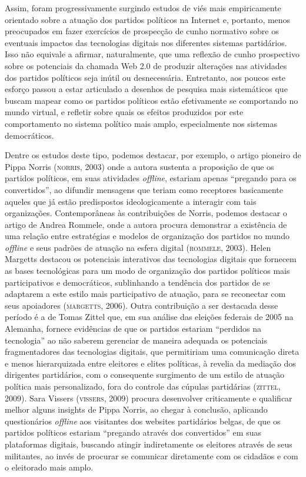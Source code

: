 Assim, foram progressivamente surgindo estudos de viés mais
empiricamente orientado sobre a atuação dos partidos políticos na
Internet e, portanto, menos preocupados em fazer exercícios de
prospecção de cunho normativo sobre os eventuais impactos das
tecnologias digitais nos diferentes sistemas partidários. Isso não
equivale a afirmar, naturalmente, que uma reflexão de cunho prospectivo
sobre os potenciais da chamada Web 2.0 de produzir alterações nas
atividades dos partidos políticos seja inútil ou desnecessária.
Entretanto, aos poucos este esforço passou a estar articulado a desenhos
de pesquisa mais sistemáticos que buscam mapear como os partidos
políticos estão efetivamente se comportando no mundo virtual, e refletir
sobre quais os efeitos produzidos por este comportamento no sistema
político mais amplo, especialmente nos sistemas democráticos.

Dentre os estudos deste tipo, podemos destacar, por exemplo, o artigo
pioneiro de Pippa Norris (\textsc{norris}, 2003) onde a autora sustenta a
proposição de que os partidos políticos, em suas atividades \emph{offline},
estariam apenas ``pregando para os convertidos'', ao difundir mensagens
que teriam como receptores basicamente aqueles que já estão predispostos
ideologicamente a interagir com tais organizações. Contemporâneas às
contribuições de Norris, podemos destacar o artigo de Andrea Rommele,
onde a autora procura demonstrar a existência de uma relação entre
estratégias e modelos de organização dos partidos no mundo \emph{offline} e
seus padrões de atuação na esfera digital (\textsc{rommele}, 2003). Helen
Margetts destacou os potenciais interativos das tecnologias digitais que
fornecem as bases tecnológicas para um modo de organização dos partidos
políticos mais participativos e democráticos, sublinhando a tendência
dos partidos de se adaptarem a este estilo mais participativo de
atuação, para se reconectar com seus apoiadores (\textsc{margetts}, 2006). Outra
contribuição a ser destacada desse período é a de Tomas Zittel que, em
sua análise das eleições federais de 2005 na Alemanha, fornece
evidências de que os partidos estariam ``perdidos na tecnologia'' ao não
saberem gerenciar de maneira adequada os potenciais fragmentadores das
tecnologias digitais, que permitiriam uma comunicação direta e menos
hierarquizada entre eleitores e elites políticas, à revelia da mediação
dos dirigentes partidários, com o consequente surgimento de um estilo de
atuação política mais personalizado, fora do controle das cúpulas
partidárias (\textsc{zittel}, 2009). Sara Vissers (\textsc{vissers}, 2009) procura
desenvolver criticamente e qualificar melhor alguns insights de Pippa
Norris, ao chegar à conclusão, aplicando questionários \emph{offline} aos
visitantes dos websites partidários belgas, de que os partidos políticos
estariam ``pregando através dos convertidos'' em suas plataformas
digitais, buscando atingir indiretamente os eleitores através de seus
militantes, ao invés de procurar se comunicar diretamente com os
cidadãos e com o eleitorado mais amplo.

